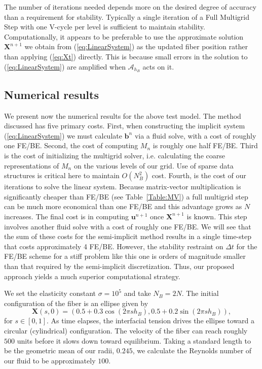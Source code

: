 \documentclass[preprint,12pt]{elsarticle}
\begin{document}
The number of iterations needed depends more on the desired degree of accuracy than a requirement for stability. Typically a single iteration of a Full Multigrid Step with one V-cycle per level is sufficient to maintain stability. 
Computationally, it appears to be preferable to use the approximate solution $\mathbf{X}^{n+1}$ we obtain from (\ref{eq:LinearSystem}) as the updated fiber position rather than applying (\ref{eq:Xt}) directly. This is because small errors in the solution to (\ref{eq:LinearSystem}) are amplified when $\mathcal{A}_{h_B}$ acts on it. 



\subsection{Numerical results}
We present now the numerical results for the above test model.
The method discussed has five primary costs. First, when constructing the implicit system (\ref{eq:LinearSystem}) we must calculate $\mathbf{b}^n$ via a fluid solve, with a cost of roughly one FE/BE. Second, the cost of computing $M_n$ is roughly one half FE/BE. Third is the cost of initializing the multigrid solver, i.e. calculating the coarse representations of $M_n$ on the various levels of our grid. Use of sparse data structures is critical here to maintain $O(N_B^2)$ cost. Fourth, is the cost of our iterations to solve the linear system. Because matrix-vector multiplication is significantly cheaper than FE/BE (see Table~\ref{Table:MV}) a full multigrid step can be much more economical than one FE/BE and this advantage grows  as $N$ increases.
The final cost is in computing $\mathbf{u}^{n+1}$ once $\mathbf{X}^{n+1}$ is known. This step involves another fluid solve with a cost of roughly one FE/BE. We will see that the sum of these costs for the semi-implicit method results in a single time-step that costs approximately 4 FE/BE. However, the stability restraint on $\Delta t$ for the FE/BE scheme for a stiff problem like this one is orders of magnitude smaller than that required by the semi-implicit discretization. Thus, our proposed approach yields a much superior computational strategy.

We set the elasticity constant $\sigma=10^5$ and take $N_B = 2N$. The initial configuration of the fiber is an ellipse given by
\begin{equation}
\mathbf{X}(s,0) = (0.5 + 0.3\cos(2\pi sh_B), 0.5 + 0.2\sin(2\pi sh_B)),
\end{equation}
for $s \in [0,1]$.
As time elapses,  the interfacial tension drives the ellipse toward a circular (cylindrical) configuration. The velocity of the fiber can reach roughly $500$ units before it slows down toward equilibrium. Taking a standard length to be the geometric mean of our radii, $0.245$, we calculate the Reynolds number of our fluid to be approximately $100$.
\end{document}
